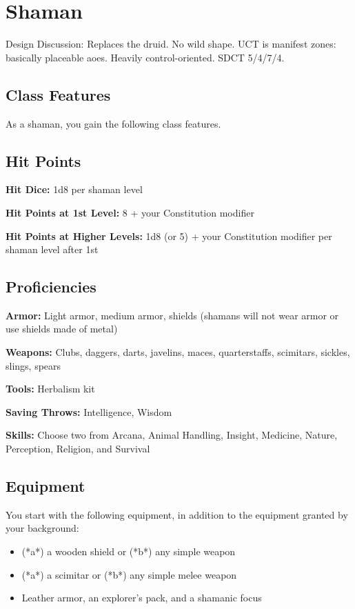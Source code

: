 \section{Shaman\label{class:shaman}}

Design Discussion: Replaces the druid. No wild shape. UCT is manifest zones: basically placeable aoes. Heavily control-oriented. SDCT 5/4/7/4.

\subsection{Class Features}

As a shaman, you gain the following class features.

\subsection{Hit Points}

\textbf{Hit Dice:} 1d8 per shaman level

\textbf{Hit Points at 1st Level:} 8 + your Constitution modifier

\textbf{Hit Points at Higher Levels:} 1d8 (or 5) + your Constitution modifier per shaman level after 1st

\subsection{Proficiencies}

\textbf{Armor:} Light armor, medium armor, shields (shamans will not wear armor or use shields made of metal)

\textbf{Weapons:} Clubs, daggers, darts, javelins, maces, quarterstaffs, scimitars, sickles, slings, spears

\textbf{Tools:} Herbalism kit

\textbf{Saving Throws:} Intelligence, Wisdom

\textbf{Skills:} Choose two from Arcana, Animal Handling, Insight, Medicine, Nature, Perception, Religion, and Survival

\subsection{Equipment}

You start with the following equipment, in addition to the equipment granted by your background:
\begin{itemize}
\item (*a*) a wooden shield or (*b*) any simple weapon
\item (*a*) a scimitar or (*b*) any simple melee weapon
\item Leather armor, an explorer's pack, and a shamanic focus
\end{itemize}

